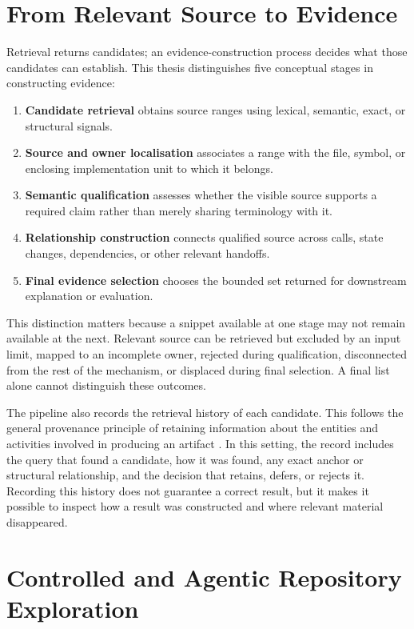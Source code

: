 \section{From Relevant Source to Evidence}\label{sec:from-relevant-source-to-evidence}

Retrieval returns candidates; an evidence-construction process decides what those candidates can establish. This thesis distinguishes five conceptual stages in constructing evidence:

\begin{enumerate}
\item \textbf{Candidate retrieval} obtains source ranges using lexical, semantic, exact, or structural signals.
\item \textbf{Source and owner localisation} associates a range with the file, symbol, or enclosing implementation unit to which it belongs.
\item \textbf{Semantic qualification} assesses whether the visible source supports a required claim rather than merely sharing terminology with it.
\item \textbf{Relationship construction} connects qualified source across calls, state changes, dependencies, or other relevant handoffs.
\item \textbf{Final evidence selection} chooses the bounded set returned for downstream explanation or evaluation.
\end{enumerate}

This distinction matters because a snippet available at one stage may not remain available at the next. Relevant source can be retrieved but excluded by an input limit, mapped to an incomplete owner, rejected during qualification, disconnected from the rest of the mechanism, or displaced during final selection. A final list alone cannot distinguish these outcomes.

The pipeline also records the retrieval history of each candidate. This follows the general provenance principle of retaining information about the entities and activities involved in producing an artifact \textcite{W3C2013PROV}. In this setting, the record includes the query that found a candidate, how it was found, any exact anchor or structural relationship, and the decision that retains, defers, or rejects it. Recording this history does not guarantee a correct result, but it makes it possible to inspect how a result was constructed and where relevant material disappeared.

\section{Controlled and Agentic Repository Exploration}\label{sec:controlled-and-agentic-repository-exploration}

